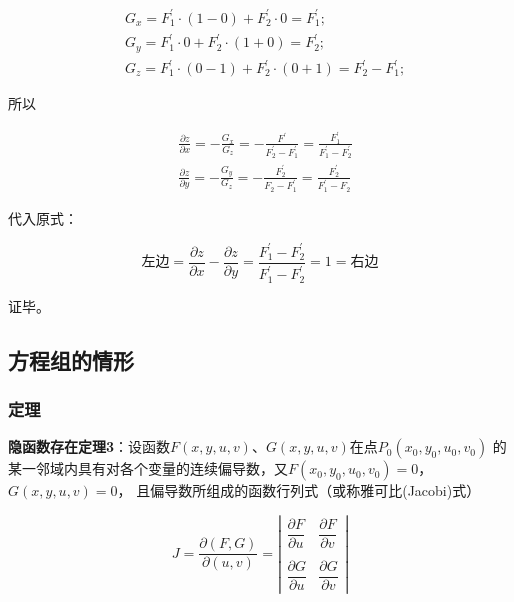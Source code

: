 \documentclass[12pt, a4paper]{article}
\numberwithin{equation}{section}
\begin{document}
    $$
        \begin{aligned}
            & G_x=F_1^{\prime} \cdot(1-0)+F_2^{\prime} \cdot 0=F_1^{\prime} ; \\
            & G_y=F_1^{\prime} \cdot 0+F_2^{\prime} \cdot(1+0)=F_2^{\prime} ; \\
            & G_z=F_1^{\prime} \cdot(0-1)+F_2^{\prime} \cdot(0+1)=F_2^{\prime}-F_1^{\prime} ;
        \end{aligned}
    $$

    所以

    $$
        \begin{aligned}
            & \frac{\partial z}{\partial x}=-\frac{G_x}{G_z}=-\frac{F^{\prime}}{F_2^{\prime}-F_1^{\prime}}=\frac{F_1^{\prime}}{F_1^{\prime}-F_2^{\prime}} \\
            & \frac{\partial z}{\partial y}=-\frac{G_y}{G_z}=-\frac{F_2^{\prime}}{F_2-F_1^{\prime}}=\frac{F_2^{\prime}}{F_1^{\prime}-F_2}
        \end{aligned}
    $$

    代入原式：

    $$
        \text{左边} = \frac{\partial z}{\partial x}-\frac{\partial z}{\partial y}=\frac{F_1^{\prime}-F_2^{\prime}}{F_1^{\prime}-F_2^{\prime}}=1 = \text{右边}
    $$

    证毕。

\subsection{方程组的情形}

\subsubsection{定理}

    \textbf{隐函数存在定理3}：设函数\(F\left(x,y,u,v\right)\)、\(G\left(x,y,u,v\right)\)在点\(P_0\left(x_0,y_0,u_0,v_0\right)\)
    的某一邻域内具有对各个变量的连续偏导数，又\(F\left(x_0,y_0,u_0,v_0\right)=0\)，\(G\left(x,y,u,v\right)=0\)，
    且偏导数所组成的函数行列式（或称雅可比(Jacobi)式）

    $$
        J=\frac{\partial(F, G)}{\partial(u, v)}=\left|\begin{array}{ll}
        \dfrac{\partial F}{\partial u} & \dfrac{\partial F}{\partial v} \\ \\
        \dfrac{\partial G}{\partial u} & \dfrac{\partial G}{\partial v}
        \end{array}\right|
    $$
\end{document}
